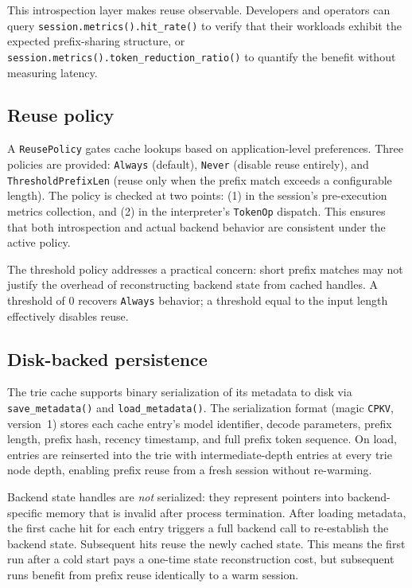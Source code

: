 \documentclass[10pt,twocolumn]{article}
\begin{document}
This introspection layer makes reuse observable. Developers and operators can query \texttt{session.metrics().hit\_rate()} to verify that their workloads exhibit the expected prefix-sharing structure, or \texttt{session.metrics().token\_reduction\_ratio()} to quantify the benefit without measuring latency.

\subsection{Reuse policy}
A \texttt{ReusePolicy} gates cache lookups based on application-level preferences. Three policies are provided: \texttt{Always} (default), \texttt{Never} (disable reuse entirely), and \texttt{ThresholdPrefixLen} (reuse only when the prefix match exceeds a configurable length). The policy is checked at two points: (1) in the session's pre-execution metrics collection, and (2) in the interpreter's \texttt{TokenOp} dispatch. This ensures that both introspection and actual backend behavior are consistent under the active policy.

The threshold policy addresses a practical concern: short prefix matches may not justify the overhead of reconstructing backend state from cached handles. A threshold of 0 recovers \texttt{Always} behavior; a threshold equal to the input length effectively disables reuse.

\subsection{Disk-backed persistence}
The trie cache supports binary serialization of its metadata to disk via \texttt{save\_metadata()} and \texttt{load\_metadata()}. The serialization format (magic \texttt{CPKV}, version~1) stores each cache entry's model identifier, decode parameters, prefix length, prefix hash, recency timestamp, and full prefix token sequence. On load, entries are reinserted into the trie with intermediate-depth entries at every trie node depth, enabling prefix reuse from a fresh session without re-warming.

Backend state handles are \emph{not} serialized: they represent pointers into backend-specific memory that is invalid after process termination. After loading metadata, the first cache hit for each entry triggers a full backend call to re-establish the backend state. Subsequent hits reuse the newly cached state. This means the first run after a cold start pays a one-time state reconstruction cost, but subsequent runs benefit from prefix reuse identically to a warm session.
\end{document}
